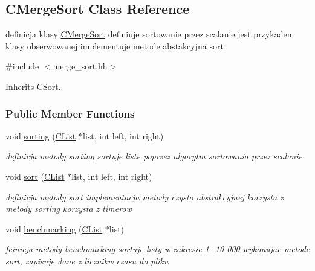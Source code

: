 \hypertarget{class_c_merge_sort}{}\subsection{C\+Merge\+Sort Class Reference}
\label{class_c_merge_sort}


definicja klasy \hyperlink{class_c_merge_sort}{C\+Merge\+Sort} definiuje sortowanie przez scalanie jest przykadem klasy obserwowanej implementuje metode abstakcyjna sort  




{\ttfamily \#include $<$merge\+\_\+sort.\+hh$>$}



Inherits \hyperlink{class_c_sort}{C\+Sort}.

\subsubsection*{Public Member Functions}
\begin{DoxyCompactItemize}
\item 
void \hyperlink{class_c_merge_sort_a93fee6618c382c29957c35affabd9e6b}{sorting} (\hyperlink{class_c_list}{C\+List} $\ast$list, int left, int right)
\begin{DoxyCompactList}\small\item\em definicja metody sorting sortuje liste poprzez algorytm sortowania przez scalanie \end{DoxyCompactList}\item 
void \hyperlink{class_c_merge_sort_a5becc6aef876cfc13abe746dea5a4f70}{sort} (\hyperlink{class_c_list}{C\+List} $\ast$list, int left, int right)
\begin{DoxyCompactList}\small\item\em definicja metody sort implementacja metody czysto abstrakcyjnej korzysta z metody sorting korzysta z timerow \end{DoxyCompactList}\item 
void \hyperlink{class_c_merge_sort_add3bb6f2c5f822eb1d435a0652bdf431}{benchmarking} (\hyperlink{class_c_list}{C\+List} $\ast$list)
\begin{DoxyCompactList}\small\item\em feinicja metody benchmarking sortuje listy w zakresie 1-\/ 10 000 wykonujac metode sort, zapisuje dane z licznikw czasu do pliku \end{DoxyCompactList}\end{DoxyCompactItemize}


